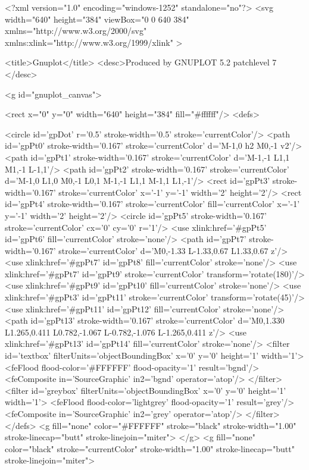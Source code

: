 <?xml version="1.0" encoding="windows-1252"  standalone="no"?>
<svg 
 width="640" height="384"
 viewBox="0 0 640 384"
 xmlns="http://www.w3.org/2000/svg"
 xmlns:xlink="http://www.w3.org/1999/xlink"
>

<title>Gnuplot</title>
<desc>Produced by GNUPLOT 5.2 patchlevel 7 </desc>

<g id="gnuplot_canvas">

<rect x="0" y="0" width="640" height="384" fill="#ffffff"/>
<defs>

	<circle id='gpDot' r='0.5' stroke-width='0.5' stroke='currentColor'/>
	<path id='gpPt0' stroke-width='0.167' stroke='currentColor' d='M-1,0 h2 M0,-1 v2'/>
	<path id='gpPt1' stroke-width='0.167' stroke='currentColor' d='M-1,-1 L1,1 M1,-1 L-1,1'/>
	<path id='gpPt2' stroke-width='0.167' stroke='currentColor' d='M-1,0 L1,0 M0,-1 L0,1 M-1,-1 L1,1 M-1,1 L1,-1'/>
	<rect id='gpPt3' stroke-width='0.167' stroke='currentColor' x='-1' y='-1' width='2' height='2'/>
	<rect id='gpPt4' stroke-width='0.167' stroke='currentColor' fill='currentColor' x='-1' y='-1' width='2' height='2'/>
	<circle id='gpPt5' stroke-width='0.167' stroke='currentColor' cx='0' cy='0' r='1'/>
	<use xlink:href='#gpPt5' id='gpPt6' fill='currentColor' stroke='none'/>
	<path id='gpPt7' stroke-width='0.167' stroke='currentColor' d='M0,-1.33 L-1.33,0.67 L1.33,0.67 z'/>
	<use xlink:href='#gpPt7' id='gpPt8' fill='currentColor' stroke='none'/>
	<use xlink:href='#gpPt7' id='gpPt9' stroke='currentColor' transform='rotate(180)'/>
	<use xlink:href='#gpPt9' id='gpPt10' fill='currentColor' stroke='none'/>
	<use xlink:href='#gpPt3' id='gpPt11' stroke='currentColor' transform='rotate(45)'/>
	<use xlink:href='#gpPt11' id='gpPt12' fill='currentColor' stroke='none'/>
	<path id='gpPt13' stroke-width='0.167' stroke='currentColor' d='M0,1.330 L1.265,0.411 L0.782,-1.067 L-0.782,-1.076 L-1.265,0.411 z'/>
	<use xlink:href='#gpPt13' id='gpPt14' fill='currentColor' stroke='none'/>
	<filter id='textbox' filterUnits='objectBoundingBox' x='0' y='0' height='1' width='1'>
	  <feFlood flood-color='#FFFFFF' flood-opacity='1' result='bgnd'/>
	  <feComposite in='SourceGraphic' in2='bgnd' operator='atop'/>
	</filter>
	<filter id='greybox' filterUnits='objectBoundingBox' x='0' y='0' height='1' width='1'>
	  <feFlood flood-color='lightgrey' flood-opacity='1' result='grey'/>
	  <feComposite in='SourceGraphic' in2='grey' operator='atop'/>
	</filter>
</defs>
<g fill="none" color="#FFFFFF" stroke="black" stroke-width="1.00" stroke-linecap="butt" stroke-linejoin="miter">
</g>
<g fill="none" color="black" stroke="currentColor" stroke-width="1.00" stroke-linecap="butt" stroke-linejoin="miter">
